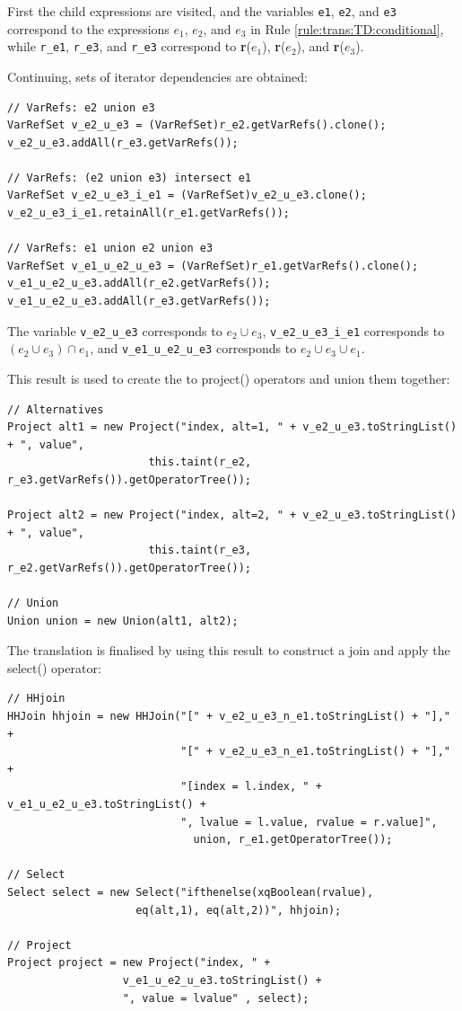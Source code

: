 First the child expressions are visited, and the variables \texttt{e1},
\texttt{e2}, and \texttt{e3} correspond to the expressions $e_1$, $e_2$, and
$e_3$ in Rule \ref{rule:trans:TD:conditional},  while \texttt{r\_e1},
\texttt{r\_e3}, and \texttt{r\_e3} correspond to \textbf{r}($e_1$),
\textbf{r}($e_2$), and \textbf{r}($e_3$).

Continuing, sets of iterator dependencies are obtained:
         
\begin{Verbatim}
// VarRefs: e2 union e3
VarRefSet v_e2_u_e3 = (VarRefSet)r_e2.getVarRefs().clone();
v_e2_u_e3.addAll(r_e3.getVarRefs());

// VarRefs: (e2 union e3) intersect e1
VarRefSet v_e2_u_e3_i_e1 = (VarRefSet)v_e2_u_e3.clone();
v_e2_u_e3_i_e1.retainAll(r_e1.getVarRefs());

// VarRefs: e1 union e2 union e3
VarRefSet v_e1_u_e2_u_e3 = (VarRefSet)r_e1.getVarRefs().clone();
v_e1_u_e2_u_e3.addAll(r_e2.getVarRefs());
v_e1_u_e2_u_e3.addAll(r_e3.getVarRefs());
\end{Verbatim}

The variable \texttt{v\_e2\_u\_e3} corresponds to $e_2 \cup e_3$, \texttt{v\_e2\_u\_e3\_i\_e1} corresponds to
$(e_2 \cup e_3) \cap e_1$, and \texttt{v\_e1\_u\_e2\_u\_e3} corresponds to $e_2 \cup e_3 \cup
e_1$.

This result is used to create the to \textsf{project()} operators and union
them together:

\begin{Verbatim}
// Alternatives
Project alt1 = new Project("index, alt=1, " + v_e2_u_e3.toStringList() + ", value", 
                      this.taint(r_e2, r_e3.getVarRefs()).getOperatorTree()); 

Project alt2 = new Project("index, alt=2, " + v_e2_u_e3.toStringList() + ", value", 
                      this.taint(r_e3, r_e2.getVarRefs()).getOperatorTree()); 

// Union
Union union = new Union(alt1, alt2);
\end{Verbatim}

The translation is finalised by using this result to construct a join and apply
the \textsf{select()} operator:

\begin{Verbatim}
// HHjoin
HHJoin hhjoin = new HHJoin("[" + v_e2_u_e3_n_e1.toStringList() + "]," +
                           "[" + v_e2_u_e3_n_e1.toStringList() + "]," + 
                           "[index = l.index, " + v_e1_u_e2_u_e3.toStringList() +
                           ", lvalue = l.value, rvalue = r.value]", 
                             union, r_e1.getOperatorTree());

// Select
Select select = new Select("ifthenelse(xqBoolean(rvalue), 
                    eq(alt,1), eq(alt,2))", hhjoin);

// Project
Project project = new Project("index, " + 
                  v_e1_u_e2_u_e3.toStringList() +
                  ", value = lvalue" , select);
\end{Verbatim}
